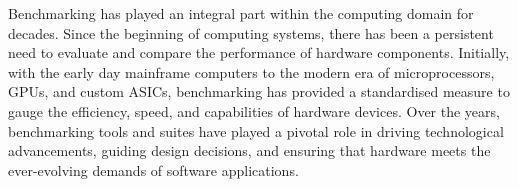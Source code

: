 



Benchmarking has played an integral part within the computing domain for decades. Since the beginning of computing systems, there has been a persistent need to evaluate and compare the performance of hardware components. Initially, with the early day mainframe computers to the modern era of microprocessors, GPUs, and custom ASICs, benchmarking has provided a standardised measure to gauge the efficiency, speed, and capabilities of hardware devices. Over the years, benchmarking tools and suites have played a pivotal role in driving technological advancements, guiding design decisions, and ensuring that hardware meets the ever-evolving demands of software applications. 

